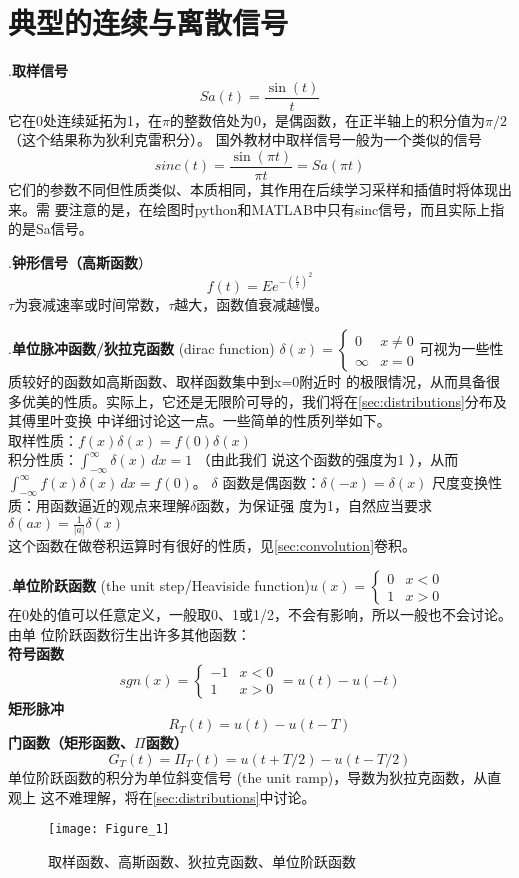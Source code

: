 \documentclass{ctexbook}
\begin{document}
\section{典型的连续与离散信号}
.\textbf{取样信号}\[Sa(t)=\frac{\sin(t)}{t}\]
它在0处连续延拓为1，在$\pi$的整数倍处为0，是偶函数，在正半轴上的积分值为$\pi /2$（这个结果称为狄利克雷积分）。
国外教材中取样信号一般为一个类似的信号\[sinc(t)=\frac{\sin(\pi t)}{\pi t}=Sa(\pi t)\]
它们的参数不同但性质类似、本质相同，其作用在后续学习采样和插值时将体现出来。需
要注意的是，在绘图时python和MATLAB中只有sinc信号，而且实际上指的是Sa信号。

.\textbf{钟形信号（高斯函数}）\[f(t)=Ee^{-{\left(\frac{t}{\tau }\right)}^2}\]
$\tau$为衰减速率或时间常数，$\tau$越大，函数值衰减越慢。

.\textbf{单位脉冲函数/狄拉克函数} (dirac function)
$\delta (x)=\begin{cases}
        0      & x\neq 0 \\
        \infty & x=0
    \end{cases}$可视为一些性质较好的函数如高斯函数、取样函数集中到x=0附近时
的极限情况，从而具备很多优美的性质。实际上，它还是无限阶可导的，我们将在\ref{sec:distributions}分布及其傅里叶变换
中详细讨论这一点。一些简单的性质列举如下。\\
 取样性质：$f(x)\delta (x)=f(0)\delta (x)$\\
 积分性质：$\int_{-\infty}^{\infty}\delta (x)\,dx=1$ （由此我们
说这个函数的强度为1 ），从而
$\int_{-\infty}^{\infty}f(x)\delta (x)\,dx=f(0)$。
 $\delta$ 函数是偶函数：$\delta (-x)=\delta (x)$
 尺度变换性质：用函数逼近的观点来理解$\delta $函数，为保证强
度为1，自然应当要求$\delta (ax)=\frac{1}{|a|}\delta (x)$\\
这个函数在做卷积运算时有很好的性质，见\ref{sec:convolution}卷积。

.\textbf{单位阶跃函数} (the unit step/Heaviside function)$u(x)=
    \begin{cases}
        0 & x<0 \\
        1 & x>0
    \end{cases}$\\
在0处的值可以任意定义，一般取0、1或1/2，不会有影响，所以一般也不会讨论。由单
位阶跃函数衍生出许多其他函数：\\
\textbf{符号函数}\[sgn(x)=\begin{cases}
        -1 & x<0 \\
        1  & x>0
    \end{cases}=u(t)-u(-t)\]
\textbf{矩形脉冲}\[R_T(t)=u(t)-u(t-T)\]
\textbf{门函数（矩形函数、$\Pi $函数）}\[G_T(t)=\Pi_T(t)=u(t+T/2)-u(t-T/2)\]
单位阶跃函数的积分为单位斜变信号 (the unit ramp)，导数为狄拉克函数，从直观上
这不难理解，将在\ref{sec:distributions}中讨论。
\begin{figure}[htbp]
    \centering
    \texttt{[image: Figure\_1]}
    \caption{取样函数、高斯函数、狄拉克函数、单位阶跃函数}
\end{figure}
\end{document}
